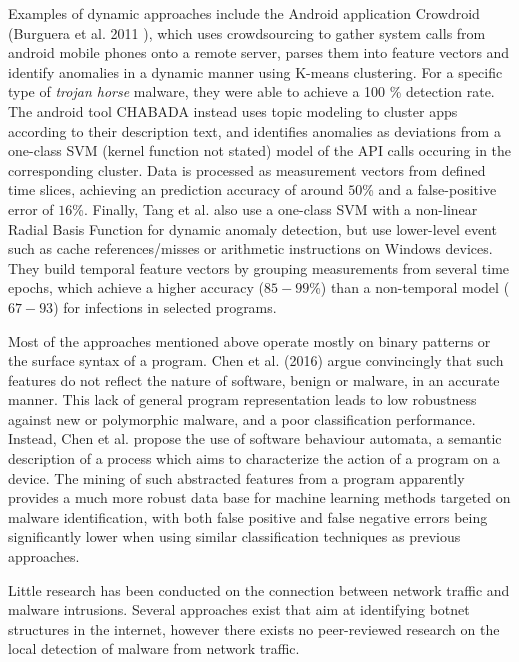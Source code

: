 \documentclass[a4paper,12pt,twoside]{report}
\begin{document}
Examples of dynamic approaches include the Android application Crowdroid (Burguera et al. 2011 \cite{burguera2011crowdroid}), which uses crowdsourcing to gather system calls from android mobile phones onto a remote server, parses them into feature vectors and identify anomalies in a dynamic manner using K-means clustering. For a specific type of \textit{trojan horse} malware, they were able to achieve a 100 \% detection rate. The android tool CHABADA \cite{gorla2014checking} instead uses topic modeling to cluster apps according to their description text, and identifies anomalies as deviations from a one-class SVM (kernel function not stated)  model of the API calls occuring in the corresponding cluster. Data is processed as measurement vectors from defined time slices, achieving an prediction accuracy of around $50$\% and a false-positive error of $16$\%. Finally, Tang et al. \cite{tang2014unsupervised} also use a one-class SVM with a non-linear Radial Basis Function for dynamic anomaly detection, but use lower-level event such as cache references/misses or arithmetic instructions on Windows devices. They build temporal feature vectors by grouping measurements from several time epochs, which achieve a higher accuracy ($85-99$\%) than a non-temporal model ($67-93$) for infections in selected programs. 


Most of the approaches mentioned above operate mostly on binary patterns or the surface syntax of a program. Chen et al. (2016) \cite{chen2016robust, chen2016more} argue convincingly that such features do not reflect the nature of software, benign or malware, in an accurate manner. This lack of general program representation leads to  low robustness against new or polymorphic malware, and a poor classification performance. Instead, Chen et al. propose the use of software behaviour automata, a semantic description of a process which aims to characterize the action of a program on a device. The mining of such abstracted features from a program apparently provides a much more robust data base for machine learning methods targeted on malware identification, with both false positive and false negative errors being significantly lower when using similar classification techniques as previous approaches. 


Little research has been conducted on the connection between network traffic and malware intrusions. Several approaches exist that aim at identifying botnet structures in the internet, however there exists no peer-reviewed research on the local detection of malware from network traffic. 
\end{document}
